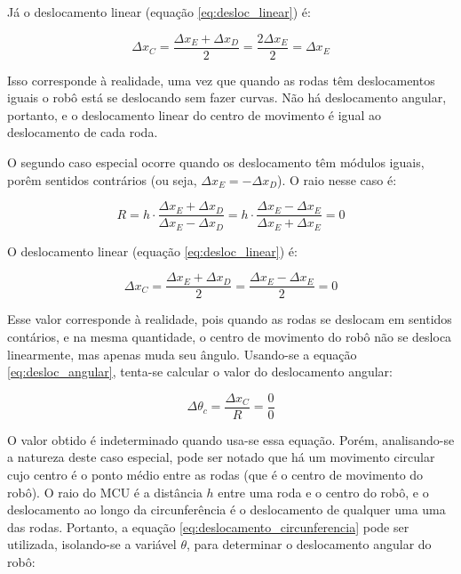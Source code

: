 Já o deslocamento linear (equação \ref{eq:desloc_linear}) é:

\begin{equation}
  \Delta x_C = \frac{\Delta x_E + \Delta x_D}{2} = \frac{2 \Delta x_E}{2} = \Delta x_E
  \label{eq:caso_especial1_x}
\end{equation}

Isso corresponde à realidade, uma vez que quando as rodas têm deslocamentos iguais o robô está se deslocando sem fazer curvas. Não há deslocamento angular, portanto, e o deslocamento linear do centro de movimento é igual ao deslocamento de cada roda.

O segundo caso especial ocorre quando os deslocamento têm módulos iguais, porêm sentidos contrários (ou seja, $\Delta x_E = - \Delta x_D$). O raio nesse caso é:

\begin{equation}
  R = h \cdot \frac{\Delta x_E + \Delta x_D} {\Delta x_E - \Delta x_D} = h \cdot \frac{\Delta x_E - \Delta x_E}{\Delta x_E + \Delta x_E} = 0
    \label{eq:caso_especial2_R}
\end{equation}


O deslocamento linear (equação \ref{eq:desloc_linear}) é:

\begin{equation}
  \Delta x_C = \frac{\Delta x_E + \Delta x_D}{2} = \frac{\Delta x_E - \Delta x_E}{2} = 0
  \label{eq:caso_especial2_x}
\end{equation}

Esse valor corresponde à realidade, pois quando as rodas se deslocam em sentidos contários, e na mesma quantidade, o centro de movimento do robô não se desloca linearmente, mas apenas muda seu ângulo.
Usando-se a equação \ref{eq:desloc_angular}, tenta-se calcular o valor do deslocamento angular:

\begin{equation}
  \Delta \theta_c = \frac{\Delta x_C}{R} = \frac{0}{0}
  \label{eq:caso_especial2_theta}
\end{equation}

O valor obtido é indeterminado quando usa-se essa equação. Porém, analisando-se a natureza deste caso especial, pode ser notado que há um movimento circular cujo centro é o ponto médio entre as rodas (que é o centro de movimento do robô). O raio do MCU é a distância $h$ entre uma roda e o centro do robô, e o deslocamento ao longo da circunferência é o deslocamento de qualquer uma uma das rodas. Portanto, a equação \ref{eq:deslocamento_circunferencia} pode ser utilizada, isolando-se a variável $\theta$, para determinar o deslocamento angular do robô:

